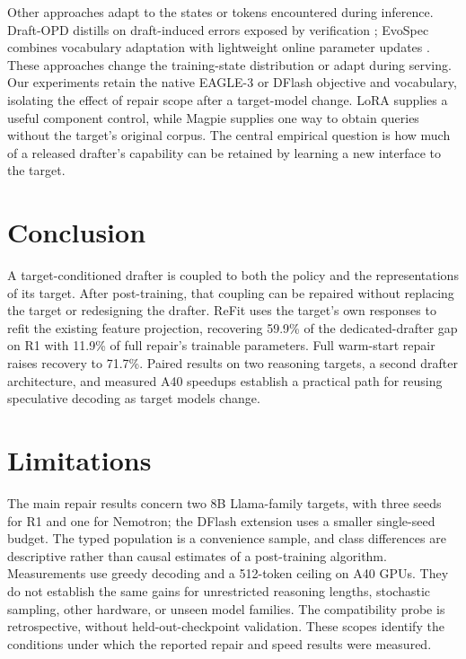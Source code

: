 \documentclass[11pt]{article}
\newcommand{\method}{ReFit}
\begin{document}
Other approaches adapt to the states or tokens encountered during inference. Draft-OPD distills on draft-induced errors exposed by verification \citep{draftopd2026}; EvoSpec combines vocabulary adaptation with lightweight online parameter updates \citep{evospec2026}. These approaches change the training-state distribution or adapt during serving. Our experiments retain the native EAGLE-3 or DFlash objective and vocabulary, isolating the effect of repair scope after a target-model change. LoRA \citep{lora2021} supplies a useful component control, while Magpie \citep{magpie2024} supplies one way to obtain queries without the target's original corpus. The central empirical question is how much of a released drafter's capability can be retained by learning a new interface to the target.

\section{Conclusion}
A target-conditioned drafter is coupled to both the policy and the representations of its target. After post-training, that coupling can be repaired without replacing the target or redesigning the drafter. \method{} uses the target's own responses to refit the existing feature projection, recovering 59.9\% of the dedicated-drafter gap on R1 with 11.9\% of full repair's trainable parameters. Full warm-start repair raises recovery to 71.7\%. Paired results on two reasoning targets, a second drafter architecture, and measured A40 speedups establish a practical path for reusing speculative decoding as target models change.

\section*{Limitations}
The main repair results concern two 8B Llama-family targets, with three seeds for R1 and one for Nemotron; the DFlash extension uses a smaller single-seed budget. The typed population is a convenience sample, and class differences are descriptive rather than causal estimates of a post-training algorithm. Measurements use greedy decoding and a 512-token ceiling on A40 GPUs. They do not establish the same gains for unrestricted reasoning lengths, stochastic sampling, other hardware, or unseen model families. The compatibility probe is retrospective, without held-out-checkpoint validation. These scopes identify the conditions under which the reported repair and speed results were measured.
\end{document}
